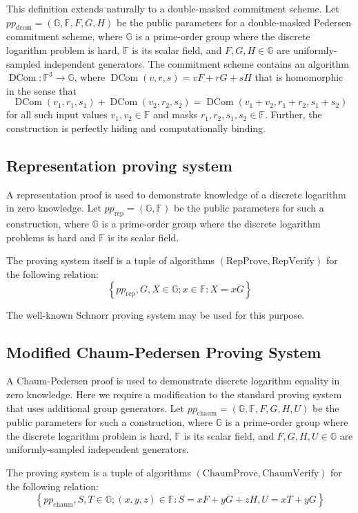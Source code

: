 \documentclass{llncs}
\newcommand{\G}{\mathbb{G}}
\newcommand{\F}{\mathbb{F}}
\newcommand{\dcom}{\operatorname{DCom}}
\begin{document}
This definition extends naturally to a double-masked commitment scheme.
Let $pp_{\text{dcom}} = (\G, \F, F, G, H)$ be the public parameters for a double-masked Pedersen commitment scheme, where $\G$ is a prime-order group where the discrete logarithm problem is hard, $\F$ is its scalar field, and $F,G,H \in \G$ are uniformly-sampled independent generators.
The commitment scheme contains an algorithm $\dcom: \F^3 \to \G$, where $\dcom(v,r,s) = vF + rG + sH$ that is homomorphic in the sense that $$\dcom(v_1,r_1,s_1) + \dcom(v_2,r_2,s_2) = \dcom(v_1 + v_2,r_1 + r_2,s_1 + s_2)$$ for all such input values $v_1,v_2 \in \F$ and masks $r_1,r_2,s_1,s_2 \in \F$.
Further, the construction is perfectly hiding and computationally binding.


\subsection{Representation proving system}

A representation proof is used to demonstrate knowledge of a discrete logarithm in zero knowledge.
Let $pp_{\text{rep}} = (\G, \F)$ be the public parameters for such a construction, where $\G$ is a prime-order group where the discrete logarithm problems is hard and $\F$ is its scalar field.

The proving system itself is a tuple of algorithms $(\text{RepProve},\text{RepVerify})$ for the following relation:
$$\left\{ pp_{\text{rep}}, G, X \in \G ; x \in \F : X = xG \right\}$$

The well-known Schnorr proving system may be used for this purpose.


\subsection{Modified Chaum-Pedersen Proving System}

A Chaum-Pedersen proof is used to demonstrate discrete logarithm equality in zero knowledge.
Here we require a modification to the standard proving system that uses additional group generators.
Let $pp_{\text{chaum}} = (\G, \F, F, G, H, U)$ be the public parameters for such a construction, where $\G$ is a prime-order group where the discrete logarithm problem is hard, $\F$ is its scalar field, and $F,G,H,U \in \G$ are uniformly-sampled independent generators.

The proving system is a tuple of algorithms $(\text{ChaumProve},\text{ChaumVerify})$ for the following relation:
$$\left\{ pp_{\text{chaum}}, S, T \in \G ; (x, y, z) \in \F : S = xF + yG + zH, U = xT + yG \right\}$$
\end{document}
